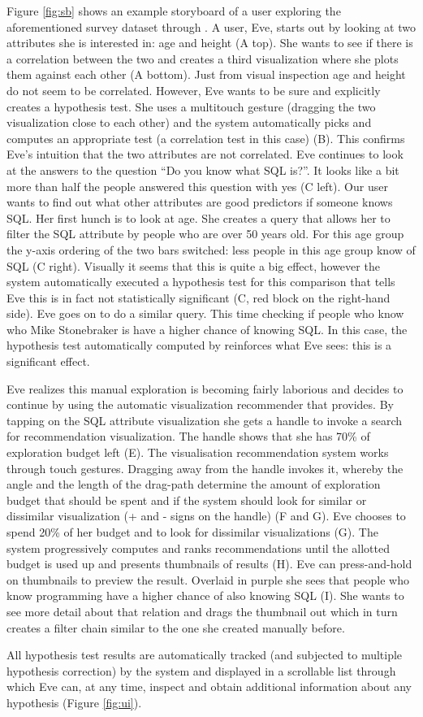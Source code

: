 Figure \ref{fig:sb} shows an example storyboard of a user exploring the aforementioned survey dataset through \system{}. A user, Eve, starts out by looking at two attributes she is interested in: age and height (A top). She wants to see if there is a correlation between the two and creates a third visualization where she plots them against each other (A bottom). Just from visual inspection age and height do not seem to be correlated. However, Eve wants to be sure and explicitly creates a hypothesis test. She uses a multitouch gesture (dragging the two visualization close to each other) and the system automatically picks and computes an appropriate test (a correlation test in this case) (B). This confirms Eve's intuition that the two attributes are not correlated. Eve continues to look at the answers to the question ``Do you know what SQL is?''. It looks like a bit more than half the people answered this question with yes (C left). Our user wants to find out what other attributes are good predictors if someone knows SQL. Her first hunch is to look at age. She creates a query that allows her to filter the SQL attribute by people who are over 50 years old. For this age group the y-axis ordering of the two bars switched: less people in this age group know of SQL (C right). Visually it seems that this is quite a big effect, however the system automatically executed a hypothesis test for this comparison that tells Eve this is in fact not statistically significant (C, red block on the right-hand side). Eve goes on to do a similar query. This time checking if people who know who Mike Stonebraker is have a higher chance of knowing SQL. In this case, the hypothesis test automatically computed by \system{} reinforces what Eve sees: this is a significant effect. 

Eve realizes this manual exploration is becoming fairly laborious and decides to continue by using the automatic visualization recommender that \system{} provides. By tapping on the SQL attribute visualization she gets a handle to invoke a search for recommendation visualization. The handle shows that she has 70\% of exploration budget left (E). The visualisation recommendation system works through touch gestures. Dragging away from the handle invokes it, whereby the angle and the length of the drag-path determine the amount of exploration budget that should be spent and if the system should look for similar or dissimilar visualization (+ and - signs on the handle) (F and G). Eve chooses to spend 20\% of her budget and to look for dissimilar visualizations (G). The system progressively computes and ranks recommendations until the allotted budget is used up and presents thumbnails of results (H). Eve can press-and-hold on thumbnails to preview the result. Overlaid in purple she sees that people who know programming have a higher chance of also knowing SQL (I). She wants to see more detail about that relation and drags the thumbnail out which in turn creates a filter chain similar to the one she created manually before. 

All hypothesis test results are automatically tracked (and subjected to multiple hypothesis correction) by the system and displayed in a scrollable list through which Eve can, at any time, inspect and obtain additional information about any hypothesis (Figure \ref{fig:ui}). 
